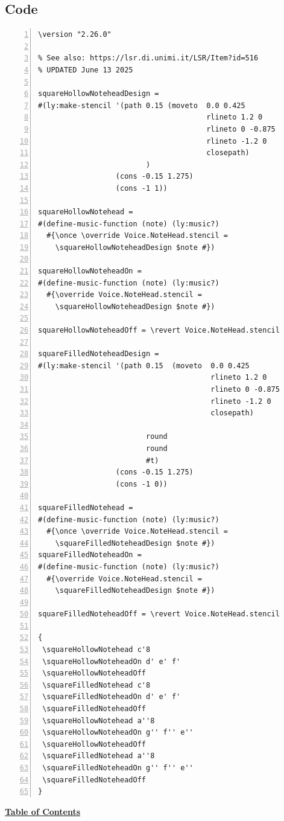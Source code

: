 \subsection{Code}
\begin{Verbatim}[numbers=left,xleftmargin=5mm]
\version "2.26.0"

% See also: https://lsr.di.unimi.it/LSR/Item?id=516
% UPDATED June 13 2025

squareHollowNoteheadDesign =
#(ly:make-stencil '(path 0.15 (moveto  0.0 0.425
                                       rlineto 1.2 0
                                       rlineto 0 -0.875
                                       rlineto -1.2 0
                                       closepath)
                         )
                  (cons -0.15 1.275)
                  (cons -1 1))

squareHollowNotehead =
#(define-music-function (note) (ly:music?)
  #{\once \override Voice.NoteHead.stencil =
    \squareHollowNoteheadDesign $note #})

squareHollowNoteheadOn =
#(define-music-function (note) (ly:music?)
  #{\override Voice.NoteHead.stencil =
    \squareHollowNoteheadDesign $note #})

squareHollowNoteheadOff = \revert Voice.NoteHead.stencil

squareFilledNoteheadDesign =
#(ly:make-stencil '(path 0.15  (moveto  0.0 0.425
                                        rlineto 1.2 0
                                        rlineto 0 -0.875
                                        rlineto -1.2 0
                                        closepath)

                         round
                         round
                         #t)
                  (cons -0.15 1.275)
                  (cons -1 0))

squareFilledNotehead =
#(define-music-function (note) (ly:music?)
  #{\once \override Voice.NoteHead.stencil =
    \squareFilledNoteheadDesign $note #})
squareFilledNoteheadOn =
#(define-music-function (note) (ly:music?)
  #{\override Voice.NoteHead.stencil =
    \squareFilledNoteheadDesign $note #})

squareFilledNoteheadOff = \revert Voice.NoteHead.stencil

{
 \squareHollowNotehead c'8
 \squareHollowNoteheadOn d' e' f'
 \squareHollowNoteheadOff
 \squareFilledNotehead c'8
 \squareFilledNoteheadOn d' e' f'
 \squareFilledNoteheadOff
 \squareHollowNotehead a''8
 \squareHollowNoteheadOn g'' f'' e''
 \squareHollowNoteheadOff
 \squareFilledNotehead a''8
 \squareFilledNoteheadOn g'' f'' e''
 \squareFilledNoteheadOff
}
\end{Verbatim}
\hyperref[sec:toc]{\textbf{Table of Contents}}

